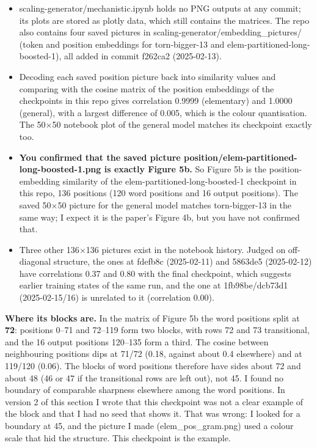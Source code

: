 \documentclass[paper=a4,fontsize=11pt,DIV=11,parskip=half,headings=small,numbers=noendperiod]{scrartcl}
\DeclareRobustCommand{\lead}[1]{\textsf{\bfseries\color{accent}#1}}
\DeclareRobustCommand{\code}[1]{{\fontseries{m}\ttfamily #1}}
\begin{document}
\begin{itemize}
\item \code{scaling-\allowbreak{}generator/\allowbreak{}mechanistic.\allowbreak{}ipynb} holds no PNG outputs at
  any commit; its plots are stored as plotly data, which still contains the matrices. The repo also contains
  four saved pictures in \code{scaling-\allowbreak{}generator/\allowbreak{}embedding\_\allowbreak{}pictures/}
  (token and position embeddings for \code{torn-\allowbreak{}bigger-\allowbreak{}13} and
  \code{elem-\allowbreak{}partitioned-\allowbreak{}long-\allowbreak{}boosted-\allowbreak{}1}), all added in
  commit \code{f262ca2} (2025-02-13).
\item Decoding each saved position picture back into similarity values and comparing with the cosine matrix of
  the position embeddings of the checkpoints in this repo gives correlation 0.9999 (elementary) and 1.0000
  (general), with a largest difference of 0.005, which is the colour quantisation. The 50\ensuremath{\times}50
  notebook plot of the general model matches its checkpoint exactly too.
\item \lead{You confirmed that the saved picture
  \code{position/\allowbreak{}elem-\allowbreak{}partitioned-\allowbreak{}long-\allowbreak{}boosted-\allowbreak{}1.\allowbreak{}png}
  is exactly Figure 5b.} So Figure 5b is the position-embedding similarity of the
  \code{elem-\allowbreak{}partitioned-\allowbreak{}long-\allowbreak{}boosted-\allowbreak{}1} checkpoint in this
  repo, 136 positions (120 word positions and 16 output positions). The saved 50\ensuremath{\times}50 picture
  for the general model matches \code{torn-\allowbreak{}bigger-\allowbreak{}13} in the same way; I expect it is
  the paper’s Figure 4b, but you have not confirmed that.
\item Three other 136\ensuremath{\times}136 pictures exist in the notebook history. Judged on off-diagonal
  structure, the ones at \code{fdefb8c} (2025-02-11) and \code{5863de5} (2025-02-12) have correlations 0.37 and
  0.80 with the final checkpoint, which suggests earlier training states of the same run, and the one at
  \code{1fb98be}/\code{dcb73d1} (2025-02-15/16) is unrelated to it (correlation 0.00).
\end{itemize}

\lead{Where its blocks are.} In the matrix of Figure 5b the word positions split at \textbf{72}: positions 0–71
and 72–119 form two blocks, with rows 72 and 73 transitional, and the 16 output positions 120–135 form a third.
The cosine between neighbouring positions dips at 71/72 (0.18, against about 0.4 elsewhere) and at 119/120
(0.06). The blocks of word positions therefore have sides about 72 and about 48 (46 or 47 if the transitional
rows are left out), not 45. I found no boundary of comparable sharpness elsewhere among the word positions. In
version 2 of this section I wrote that this checkpoint was not a clear example of the block and that I had no
seed that shows it. That was wrong: I looked for a boundary at 45, and the picture I made
(\code{elem\_\allowbreak{}pos\_\allowbreak{}gram.\allowbreak{}png}) used a colour scale that hid the structure.
This checkpoint is the example.
\end{document}

